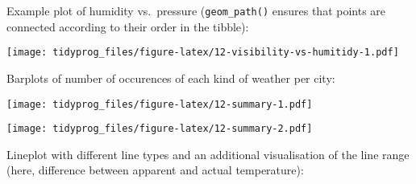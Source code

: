 \documentclass[]{book}
\newenvironment{Shaded}{\begin{snugshade}}{\end{snugshade}}
\newcommand{\DataTypeTok}[1]{\textcolor[rgb]{0.13,0.29,0.53}{#1}}
\newcommand{\KeywordTok}[1]{\textcolor[rgb]{0.13,0.29,0.53}{\textbf{#1}}}
\newcommand{\NormalTok}[1]{#1}
\newcommand{\OperatorTok}[1]{\textcolor[rgb]{0.81,0.36,0.00}{\textbf{#1}}}
\newcommand{\StringTok}[1]{\textcolor[rgb]{0.31,0.60,0.02}{#1}}
\begin{document}
Example plot of humidity vs.~pressure (\texttt{geom\_path()} ensures that points are connected according to their order in the tibble):

\begin{Shaded}
\end{Shaded}

\texttt{[image: tidyprog\_files/figure-latex/12-visibility-vs-humitidy-1.pdf]}

Barplots of number of occurences of each kind of weather per city:

\begin{Shaded}
\end{Shaded}

\texttt{[image: tidyprog\_files/figure-latex/12-summary-1.pdf]}

\begin{Shaded}
\end{Shaded}

\texttt{[image: tidyprog\_files/figure-latex/12-summary-2.pdf]}

Lineplot with different line types and an additional visualisation of the line range (here, difference between apparent and actual temperature):
\end{document}
